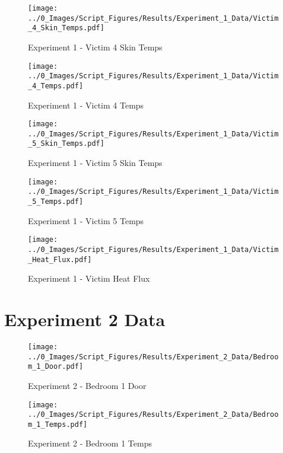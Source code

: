	\begin{figure}[H]
		\centering
		\texttt{[image: ../0\_Images/Script\_Figures/Results/Experiment\_1\_Data/Victim\_4\_Skin\_Temps.pdf]}
		\caption[]{Experiment 1 - Victim 4 Skin Temps}
	\end{figure}
 
	\clearpage

	\begin{figure}[H]
		\centering
		\texttt{[image: ../0\_Images/Script\_Figures/Results/Experiment\_1\_Data/Victim\_4\_Temps.pdf]}
		\caption[]{Experiment 1 - Victim 4 Temps}
	\end{figure}
 

	\begin{figure}[H]
		\centering
		\texttt{[image: ../0\_Images/Script\_Figures/Results/Experiment\_1\_Data/Victim\_5\_Skin\_Temps.pdf]}
		\caption[]{Experiment 1 - Victim 5 Skin Temps}
	\end{figure}
 
	\clearpage

	\begin{figure}[H]
		\centering
		\texttt{[image: ../0\_Images/Script\_Figures/Results/Experiment\_1\_Data/Victim\_5\_Temps.pdf]}
		\caption[]{Experiment 1 - Victim 5 Temps}
	\end{figure}
 

	\begin{figure}[H]
		\centering
		\texttt{[image: ../0\_Images/Script\_Figures/Results/Experiment\_1\_Data/Victim\_Heat\_Flux.pdf]}
		\caption[]{Experiment 1 - Victim Heat Flux}
	\end{figure}
 
	\clearpage

\clearpage		\large
\section{Experiment 2 Data} \label{App:Exp2Results} 

	\begin{figure}[H]
		\centering
		\texttt{[image: ../0\_Images/Script\_Figures/Results/Experiment\_2\_Data/Bedroom\_1\_Door.pdf]}
		\caption[]{Experiment 2 - Bedroom 1 Door}
	\end{figure}
 

	\begin{figure}[H]
		\centering
		\texttt{[image: ../0\_Images/Script\_Figures/Results/Experiment\_2\_Data/Bedroom\_1\_Temps.pdf]}
		\caption[]{Experiment 2 - Bedroom 1 Temps}
	\end{figure}
 
